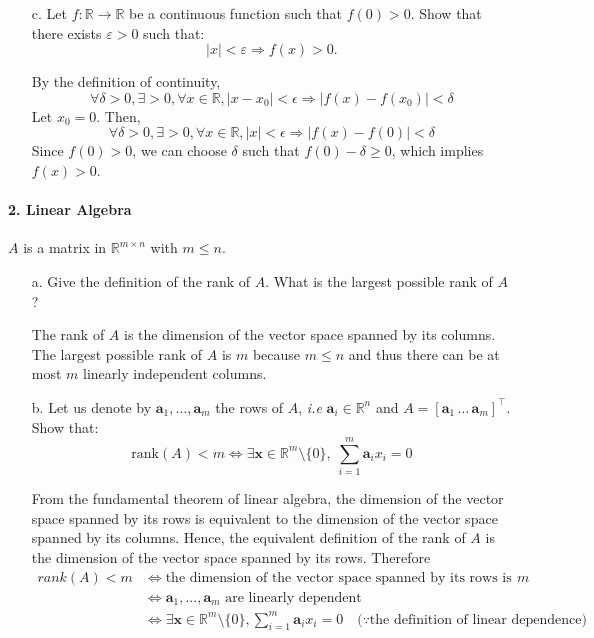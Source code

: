 \documentclass[11pt]{article}
\newcommand{\eps}{\varepsilon}
\newcommand{\R}{\mathbb{R}}                     %
\newcommand{\bx}{\mathbf{x}}
\newcommand{\ba}{\mathbf{a}}
\begin{document}
\begin{itemize}
\item[c.] Let $f:\R\to\R$ be a continuous function such that $f(0) > 0$.
Show that there exists $\eps>0$ such that:
\begin{displaymath}
    |x|< \eps \Rightarrow f(x) > 0.
\end{displaymath}

\color{blue}
By the definition of continuity, 
$$\forall \delta > 0, \exists > 0, \forall x \in \R, |x-x_0| < \epsilon \Rightarrow |f(x)-f(x_0)| < \delta$$
Let $x_0=0$. Then, 
$$\forall \delta > 0, \exists > 0, \forall x \in \R, |x| < \epsilon \Rightarrow |f(x)-f(0)| < \delta$$
Since $f(0) > 0$, we can choose $\delta$ such that $f(0) - \delta \geq 0$, which implies $f(x)>0$.

\color{black}


\end{itemize}


\paragraph{2. Linear Algebra}

$A$ is a matrix in $\R^{m\times n}$ with $m\leq n$.

\begin{itemize}
\item[a.] Give the definition of the rank of $A$. What is the largest possible
    rank of $A$?
    
\color{blue}
The rank of $A$ is the dimension of the vector space spanned by its columns. The largest possible rank of $A$ is $m$ because $m\leq n$ and thus there can be at most $m$ linearly independent columns.
\color{black}

\item[b.] Let us denote by $\ba_1,\dots, \ba_m$ the rows of $A$, \emph{i.e}
$\ba_i\in \R^n$ and $A = [\ba_1\, \dots\, \ba_m]^\intercal$.
Show that:
\begin{displaymath}
    \text{rank}(A) < m \Leftrightarrow \exists \bx\in \R^m\setminus\{0\},\;
    \sum_{i=1}^m \ba_i x_i = 0
\end{displaymath}

\color{blue}
From the fundamental theorem of linear algebra, the dimension of the vector space spanned by its rows is equivalent to the dimension of the vector space spanned by its columns. Hence, the equivalent definition of the rank of $A$ is the dimension of the vector space spanned by its rows. Therefore
\begin{align*}
rank(A) < m &\Leftrightarrow \text{the dimension of the vector space spanned by its rows is less than $m$}&\\
&\Leftrightarrow \text{$\ba_1,...,\ba_m$ are linearly dependent} &\\
&\Leftrightarrow \exists \bx \in \mathbb{R}^m \setminus \{0\}, \sum_{i=1}^m \ba_i x_i=0 \quad (\because \text{the definition of linear dependence)}&\\
\end{align*}
\color{black}

\end{itemize}
\end{document}
